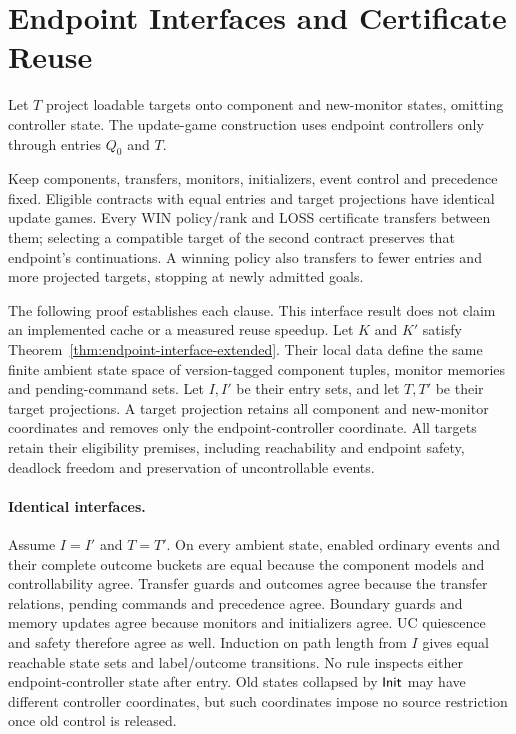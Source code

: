 \section{Endpoint Interfaces and Certificate Reuse}\label{ta:endpoint-interface}
Let $T$ project loadable targets onto component and new-monitor states, omitting controller state. The update-game construction uses endpoint controllers only through entries $Q_0$ and $T$.
\begin{theorem}\label{thm:endpoint-interface-extended}
Keep components, transfers, monitors, initializers, event control and precedence fixed. Eligible contracts with equal entries and target projections have identical update games. Every WIN policy/rank and LOSS certificate transfers between them; selecting a compatible target of the second contract preserves that endpoint's continuations. A winning policy also transfers to fewer entries and more projected targets, stopping at newly admitted goals.
\end{theorem}
The following proof establishes each clause. This interface result does not claim an implemented cache or a measured reuse speedup.
Let $K$ and $K'$ satisfy Theorem~\ref{thm:endpoint-interface-extended}. Their local data define the same finite ambient state space of version-tagged component tuples, monitor memories and pending-command sets. Let $I,I'$ be their entry sets, and let $T,T'$ be their target projections. A target projection retains all component and new-monitor coordinates and removes only the endpoint-controller coordinate. All targets retain their eligibility premises, including reachability and endpoint safety, deadlock freedom and preservation of uncontrollable events.

\paragraph{Identical interfaces.}
Assume $I=I'$ and $T=T'$. On every ambient state, enabled ordinary events and their complete outcome buckets are equal because the component models and controllability agree. Transfer guards and outcomes agree because the transfer relations, pending commands and precedence agree. Boundary guards and memory updates agree because monitors and initializers agree. UC quiescence and safety therefore agree as well. Induction on path length from $I$ gives equal reachable state sets and label/outcome transitions. No rule inspects either endpoint-controller state after entry. Old states collapsed by $\mathsf{Init}$ may have different controller coordinates, but such coordinates impose no source restriction once old control is released.

